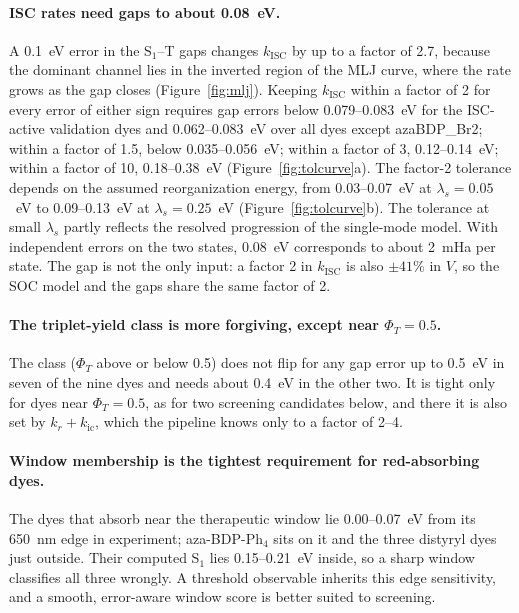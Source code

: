 \documentclass[journal=jctcce,manuscript=article,layout=twocolumn]{achemso}
\newcommand{\kisc}{k_\mathrm{ISC}}
\begin{document}
\paragraph{ISC rates need gaps to about 0.08~eV.} A 0.1~eV error in the S$_1$--T gaps changes $\kisc$ by
up to a factor of 2.7, because the dominant channel lies in the inverted region of the MLJ curve, where the
rate grows as the gap closes (Figure~\ref{fig:mlj}). Keeping $\kisc$ within a factor of 2 for every error
of either sign requires gap errors below 0.079--0.083~eV for the ISC-active validation dyes and
0.062--0.083~eV over all dyes except azaBDP\_Br2; within a factor of 1.5, below 0.035--0.056~eV; within a factor of 3,
0.12--0.14~eV; within a factor of 10, 0.18--0.38~eV (Figure~\ref{fig:tolcurve}a). The factor-2 tolerance
depends on the assumed reorganization energy, from 0.03--0.07~eV at $\lambda_s=0.05$~eV to
0.09--0.13~eV at $\lambda_s=0.25$~eV (Figure~\ref{fig:tolcurve}b). The tolerance at small $\lambda_s$ partly reflects the resolved
progression of the single-mode model. With independent errors on the two states, 0.08~eV corresponds to
about 2~mHa per state. The gap is not the only input: a factor 2 in $\kisc$ is also $\pm41$\% in $V$, so the
SOC model and the gaps share the same factor of 2.

\paragraph{The triplet-yield class is more forgiving, except near $\Phi_T=0.5$.} The
class ($\Phi_T$ above or below 0.5) does not flip for any gap error up to 0.5~eV in seven of the nine
dyes and needs about 0.4~eV in the other two. It is tight only for dyes near $\Phi_T=0.5$, as for two
screening candidates below, and there it is also set by $k_r+k_\mathrm{ic}$, which the pipeline knows only
to a factor of 2--4.

\paragraph{Window membership is the tightest requirement for red-absorbing dyes.} The dyes that absorb
near the therapeutic window lie 0.00--0.07~eV from its 650~nm edge in experiment; aza-BDP-Ph$_4$ sits on
it and the three distyryl dyes just outside. Their computed S$_1$ lies 0.15--0.21~eV inside, so a sharp
window classifies all three wrongly. A threshold observable inherits this edge sensitivity, and a
smooth, error-aware window score is better suited to screening.
\end{document}
